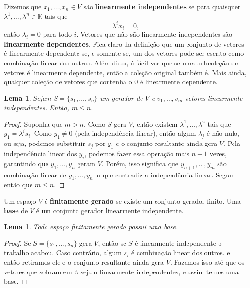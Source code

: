 \documentclass{article}
\newtheorem{lemma}[definition]{Lema}
\begin{document}
Dizemos que $x_1, \dots, x_n \in V$ são \textbf{linearmente independentes} se para quaisquer $\lambda^1, \dots, \lambda^n \in \mathbb{K}$ tais que \begin{equation}
    \lambda^i x_i = 0,
\end{equation} então $\lambda_i = 0$ para todo $i$. Vetores que não são linearmente independentes são \textbf{linearmente dependentes}. Fica claro da definição que um conjunto de vetores é linearmente dependente se, e somente se, um dos vetores pode ser escrito como combinação linear dos outros. Além disso, é fácil ver que se uma subcoleção de vetores é linearmente dependente, então a coleção original também é. Mais ainda, qualquer coleção de vetores que contenha o $0$ é linearmente dependente.

\begin{lemma}\label{lemma1}
    Sejam $S = \{s_1, \dots, s_n\}$ um gerador de $V$ e $v_1, \dots, v_m$ vetores linearmente independentes. Então, $m \leq n$.
\end{lemma}
\begin{proof}
    Suponha que $m > n$. Como $S$ gera $V$, então existem $\lambda^1, \dots, \lambda^n$ tais que $y_1 = \lambda^i s_i$. Como $y_1 \neq 0$ (pela independência linear), então algum $\lambda_j$ é não nulo, ou seja, podemos substituir $s_j$ por $y_1$ e o conjunto resultante ainda gera $V$. Pela independência linear dos $y_i$, podemos fazer essa operação mais $n-1$ vezes, garantindo que $y_1, \dots, y_n$ geram $V$. Porém, isso significa que $y_{n+1}, \dots, y_m$ são combinação linear de $y_1, \dots, y_n$, o que contradiz a independência linear. Segue então que $m \leq n$.
\end{proof}

Um espaço $V$ é \textbf{finitamente gerado} se existe um conjunto gerador finito. Uma \textbf{base} de $V$ é um conjunto gerador linearmente independente.

\begin{lemma}\label{lemma2}
    Todo espaço finitamente gerado possui uma base.
\end{lemma}
\begin{proof}
    Se $S = \{s_1, \dots, s_n\}$ gera $V$, então se $S$ é linearmente independente o trabalho acabou. Caso contrário, algum $s_i$ é combinação linear dos outros, e então retiramos ele e o conjunto resultante ainda gera $V$. Fazemos isso até que os vetores que sobram em $S$ sejam linearmente independentes, e assim temos uma base.
\end{proof}
\end{document}
